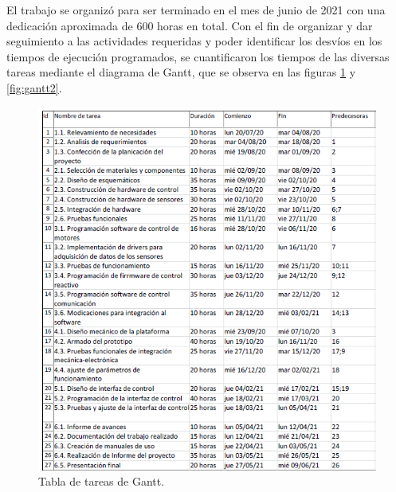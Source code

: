 El trabajo se organizó para ser terminado en el mes de junio de 2021 con una dedicación aproximada de 600 horas en total. Con el fin de organizar y dar seguimiento a las actividades requeridas y poder identificar los desvíos en los tiempos de ejecución programados, se cuantificaron los tiempos de las diversas tareas mediante el diagrama de Gantt, que se observa en las figuras \ref{fig:gantt1} y \ref{fig:gantt2}.


\begin{figure}[htpb]
\centering 
\includegraphics[width=\textwidth]{./Figures/gantttabla.PNG}
\caption{Tabla de tareas de Gantt.}
\label{fig:gantt1}
\end{figure}

